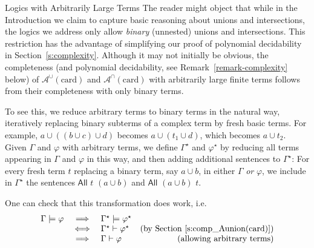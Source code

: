 \documentclass[letterpaper]{article} %
\theoremstyle{definition}
\newcommand{\proves}{\vdash}
\newcommand{\rem}[1]{\relax}
\newcommand{\Aunion}{\mathscr{A}^{\cup}}
\newcommand{\Ainter}{\mathscr{A}^{\cap}}
\newcommand{\All}[2]{\mathsf{All}\,\,#1\,\,#2}
\newcommand{\card}{\mathrm{card}}
\newcommand{\provesarbitrary}{\proves_{\mbox{\small{arb}}}}
\newcommand{\noproof}{\rem}
\begin{document}
\begin{subsection}{Logics with Arbitrarily Large Terms}
The reader might object that while in the Introduction we claim to capture basic reasoning about unions and intersections, the logics we address only allow \emph{binary} (unnested) unions and intersections. This restriction has the advantage of simplifying our proof of polynomial decidability in Section~\ref{s:complexity}. Although it may not initially be obvious, the completeness (and polynomial decidability, see Remark~\ref{remark-complexity} below) of $\Aunion(\card)$ and $\Ainter(\card)$ with arbitrarily large finite terms follows from their completeness with only binary terms.

To see this, we reduce arbitrary terms to binary terms in the natural way, iteratively replacing binary subterms of a complex term by fresh basic terms. For example, $a\cup ((b\cup c) \cup d)$ becomes $a\cup (t_1\cup d)$, which becomes $a\cup t_2$. 
Given $\Gamma$ and $\varphi$ with arbitrary terms, we define $\Gamma^\star$ and $\varphi^\star$ by reducing all terms appearing in $\Gamma$ and $\varphi$ in this way, and then adding additional sentences to $\Gamma^\star$: For every fresh term $t$ replacing a binary term, say $a \cup b$, in either $\Gamma$ \emph{or} $\varphi$, we include in $\Gamma^\star$ the sentences $\All{t}{(a \cup b)}$ and $\All{(a \cup b)}{t}$.  

One can check that this transformation does work, i.e. %
\[\begin{array}{lclr}
     \Gamma \models \varphi & 
     \implies &
     \Gamma^\star \models \varphi^\star &\\
     
     & 
     \iff &
     \Gamma^\star \proves \varphi^\star &
     \textrm{(by Section~\ref{s:comp_Aunion(card)})}\\
     
     &
     \implies &
     \Gamma \proves \varphi & \textrm{(allowing arbitrary terms)}\\
     
\end{array}
\]

\noproof{
We illustrate this fact for union terms, although the same argument can be given mutatis mutandis for intersection terms.


Formally, we define an expanded logic $\Aunion_\mathrm{arb}(\card)$ as follows. We allow nested terms by changing our definition to an inductive one: a term is either a basic term or $(x\cup y)$, where $x$ and $y$ are terms. The semantics for terms is extended to nested terms in the obvious way. The sentences and rules of $\Aunion_\mathrm{arb}(\card)$ are the same as for $\Aunion(\card)$, except that they may now contain arbitrary nested terms.  We write $\provesarbitrary$ for the provability relation for $\Aunion_\mathrm{arb}(\card)$, reserving $\proves$ for the provability relation in $\Aunion(\card)$.

}
\end{subsection}
\end{document}
